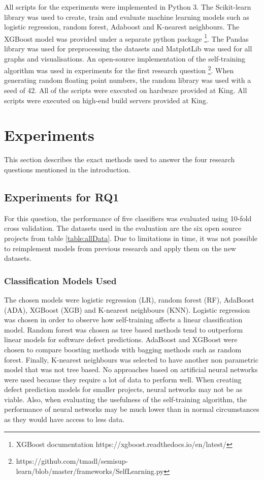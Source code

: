 \documentclass[../main.tex]{subfiles}
\begin{document}
All scripts for the experiments were implemented in Python 3. The Scikit-learn library was used to create, train and evaluate machine learning models such as logistic regression, random forest, Adaboost and K-nearest neighbours. The XGBoost model was provided under a separate python package \footnote{XGBoost documentation https://xgboost.readthedocs.io/en/latest/}. The Pandas library was used for preprocessing the datasets and MatplotLib was used for all graphs and visualisations. An open-source implementation of the self-training algorithm was used in experiments for the first research question \footnote{https://github.com/tmadl/semisup-learn/blob/master/frameworks/SelfLearning.py}. When generating random floating point numbers, the random library was used with a seed of 42. All of the scripts were executed on hardware provided at King. All scripts were executed on high-end build servers provided at King. 

\section{Experiments}

This section describes the exact methods used to answer the four research questions mentioned in the introduction. 

\subsection{Experiments for RQ1}

For this question, the performance of five classifiers was evaluated using 10-fold cross validation. The datasets used in the evaluation are the six open source projects from table \ref{table:allData}. Due to limitations in time, it was not possible to reimplement models from previous research and apply them on the new datasets. 

\subsubsection{Classification Models Used}

The chosen models were logistic regression (LR), random forest (RF), AdaBoost (ADA), XGBoost (XGB) and K-nearest neighbours (KNN). Logistic regression was chosen in order to observe how self-training affects a linear classification model. Random forest was chosen as tree based methods tend to outperform linear models for software defect predictions. AdaBoost and XGBoost were chosen to compare boosting methods with bagging methods such as random forest. Finally, K-nearest neighbours was selected to have another non parametric model that was not tree based. No approaches based on artificial neural networks were used 
because they require a lot of data to perform well. When creating defect prediction models for smaller projects, neural networks may not be as viable. Also, when evaluating the usefulness of the self-training algorithm, the performance of neural networks may be much lower than in normal circumstances as they would have access to less data.
\end{document}
